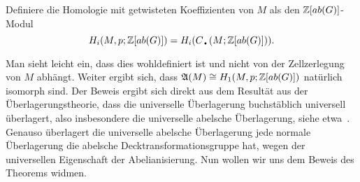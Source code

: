 	\begin{defn}
		Definiere die Homologie mit getwisteten Koeffizienten von $M$ als den $\mathbb{Z}[ab(G)]$-Modul 
		\[
		 H_i(M,p;\ZZ[ab(G)])=H_i(C_\text{\textbullet}(M;\ZZ[ab(G)])) 	.
		 \] 

	\end{defn}

	Man sieht leicht ein, dass dies wohldefiniert ist und nicht von der Zellzerlegung von $M$ abhängt. Weiter ergibt sich, dass $\mathfrak A(M) \cong H_1(M,p;\mathbb{Z}[ab(G)])$ natürlich isomorph sind. Der Beweis ergibt sich direkt aus dem Resultät aus der Überlagerungstheorie, dass die universelle Überlagerung buchstäblich universell überlagert, also insbesondere die universelle abelsche Überlagerung, siehe etwa~\cite[Kapitel~1.3]{Hatcher.2002}. Genauso überlagert die universelle abelsche Überlagerung jede normale Überlagerung die abelsche Decktransformationsgruppe hat, wegen der universellen Eigenschaft der Abelianisierung. Nun wollen wir uns dem Beweis des Theorems widmen.
    


